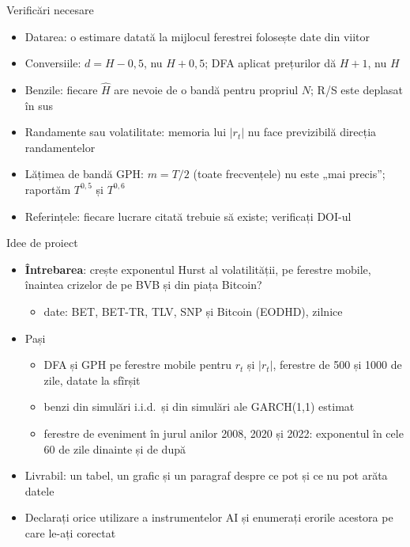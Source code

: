 \begin{frame}{Verificări necesare}
\itemsize{\small}
\begin{itemize}
    \item Datarea: o estimare datată la mijlocul ferestrei folosește date din viitor
    \item Conversiile: $d = H - 0{,}5$, nu $H + 0{,}5$; DFA aplicat prețurilor dă $H + 1$, nu $H$
    \item Benzile: fiecare $\hat H$ are nevoie de o bandă pentru propriul $N$; R/S este deplasat în sus
    \item Randamente sau volatilitate: memoria lui $|r_t|$ nu face previzibilă direcția randamentelor
    \item Lățimea de bandă GPH: $m = T/2$ (toate frecvențele) nu este „mai precis”; raportăm $T^{0{,}5}$ și $T^{0{,}6}$
    \item Referințele: fiecare lucrare citată trebuie să existe; verificați DOI-ul
\end{itemize}
\end{frame}

\begin{frame}{Idee de proiect}
\itemsize{\small}
\begin{itemize}
    \item \textbf{Întrebarea}: crește exponentul Hurst al volatilității, pe ferestre mobile, înaintea crizelor de pe BVB și din piața Bitcoin?
    \begin{itemize}
        \item date: BET, BET-TR, TLV, SNP și Bitcoin (EODHD), zilnice
    \end{itemize}
    \item Pași
    \begin{itemize}
        \item DFA și GPH pe ferestre mobile pentru $r_t$ și $|r_t|$, ferestre de 500 și 1000 de zile, datate la sfîrșit
        \item benzi din simulări i.i.d.\ și din simulări ale GARCH(1,1) estimat
        \item ferestre de eveniment în jurul anilor 2008, 2020 și 2022: exponentul în cele 60 de zile dinainte și de după
    \end{itemize}
    \item Livrabil: un tabel, un grafic și un paragraf despre ce pot și ce nu pot arăta datele
    \item Declarați orice utilizare a instrumentelor AI și enumerați erorile acestora pe care le-ați corectat
\end{itemize}
\end{frame}


